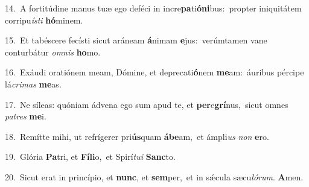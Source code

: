 {\numbfont\textcolor{\numbcolor}{14.}}~A fortitúdine manus tuæ ego deféci in incre\-\textbf{pa}\-ti\-\textbf{ó}\-\textbf{ni}bus:~\star propter iniquitátem corripu\-\textit{ís}\-\textit{ti} \textbf{hó}\-minem.\par
{\numbfont\textcolor{\numbcolor}{15.}}~Et tabéscere fecísti sicut aráneam \textbf{á}\-nimam \textbf{e}\-jus:~\star verúmtamen vane conturbátur \textit{om}\-\textit{nis} \textbf{ho}\-mo.\par
{\numbfont\textcolor{\numbcolor}{16.}}~Exáudi oratiónem meam, Dómine, et deprecati\-\textbf{ó}\-nem \textbf{me}\-am:~\star áuribus pércipe lá\-\textit{cri}\-\textit{mas} \textbf{me}\-as.\par
{\numbfont\textcolor{\numbcolor}{17.}}~Ne síleas: quóniam ádvena ego sum apud te, et \textbf{per}\-e\-\textbf{grí}\-nus,~\star sicut omnes \textit{pa}\-\textit{tres} \textbf{me}\-i.\par
{\numbfont\textcolor{\numbcolor}{18.}}~Remítte mihi, ut refrígerer pri\-\textbf{ús}\-quam \textbf{á}\-\textbf{be}am,~\star et ámpli\textit{us} \textit{non} \textbf{e}\-ro.\par
{\numbfont\textcolor{\numbcolor}{19.}}~Glória \textbf{Pa}\-tri, et \textbf{Fí}\-\textbf{li}o,~\star et Spirí\-\textit{tu}\-\textit{i} \textbf{Sanc}\-to.\par
{\numbfont\textcolor{\numbcolor}{20.}}~Sicut erat in princípio, et \textbf{nunc}\-, et \textbf{sem}\-per,~\star et in sǽcula sæcu\-\textit{ló}\-\textit{rum}. \textbf{A}\-men.\par
